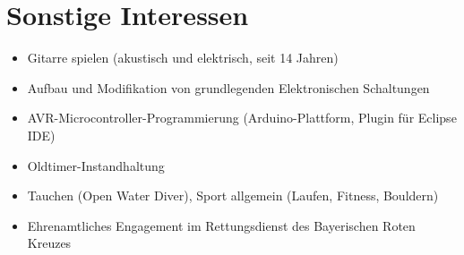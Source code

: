 

\section*{Sonstige Interessen}

\begin{itemize}
	\setlength{\itemsep}{0pt}
	\item Gitarre spielen (akustisch und elektrisch, seit 14 Jahren)
	\item Aufbau und Modifikation von grundlegenden Elektronischen Schaltungen
	\item AVR-Microcontroller-Programmierung (Arduino-Plattform, Plugin für Eclipse IDE)
	\item Oldtimer-Instandhaltung 
	\item Tauchen (Open Water Diver), Sport allgemein (Laufen, Fitness, Bouldern)
	\item Ehrenamtliches Engagement im Rettungsdienst des Bayerischen Roten Kreuzes
\end{itemize}

